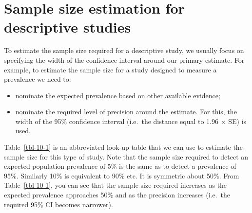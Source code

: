 \documentclass[
  a4paper,
]{memoir}
\providecommand{\tightlist}{%
  \setlength{\itemsep}{0pt}\setlength{\parskip}{0pt}}
\begin{document}
\section{Sample size estimation for descriptive
studies}\label{sample-size-estimation-for-descriptive-studies}

To estimate the sample size required for a descriptive study, we usually
focus on specifying the width of the confidence interval around our
primary estimate. For example, to estimate the sample size for a study
designed to measure a prevalence we need to:

\begin{itemize}
\tightlist
\item
  nominate the expected prevalence based on other available evidence;
\item
  nominate the required level of precision around the estimate. For
  this, the width of the 95\% confidence interval (i.e.~the distance
  equal to 1.96 \(\times\) SE) is used.
\end{itemize}

Table~\ref{tbl-10-1} is an abbreviated look-up table that we can use to
estimate the sample size for this type of study. Note that the sample
size required to detect an expected population prevalence of 5\% is the
same as to detect a prevalence of 95\%. Similarly 10\% is equivalent to
90\% etc. It is symmetric about 50\%. From Table~\ref{tbl-10-1}, you can
see that the sample size required increases as the expected prevalence
approaches 50\% and as the precision increases (i.e.~the required 95\%
CI becomes narrower).
\end{document}
